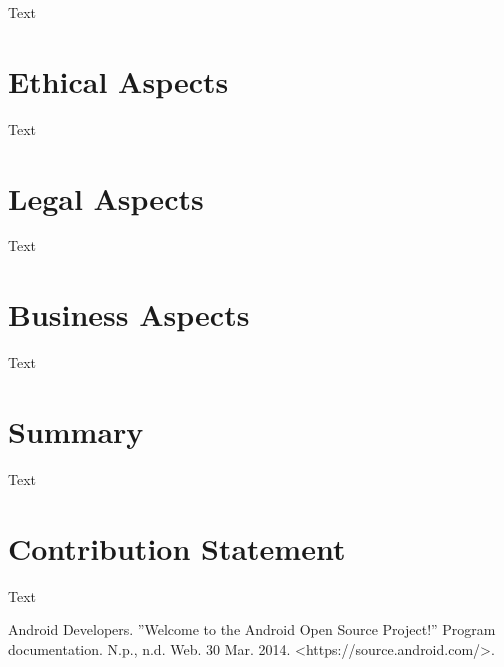 \documentclass[conference]{IEEEtran}
\begin{document}
{Text}


\section{Ethical Aspects}
\label{ethics}

{Text}


\section{Legal Aspects}
\label{legal}

{Text}


\section{Business Aspects}
\label{financial}

{Text}


\section{Summary}

{Text}


\section{Contribution Statement}

{Text}


\begin{thebibliography}{1}



Android Developers. ''Welcome to the Android Open Source Project!'' Program documentation. N.p., n.d. Web. 30 Mar. 2014. <https://source.android.com/>.

\end{thebibliography}
\end{document}
